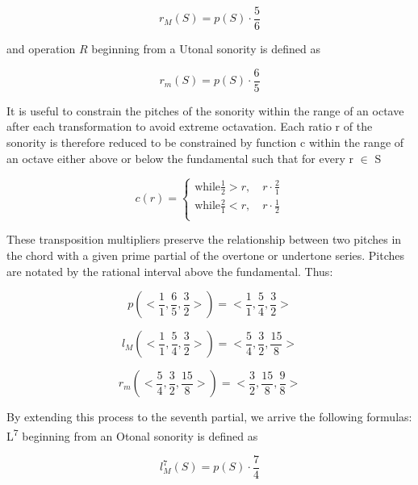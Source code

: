 \begin{equation}
    r_{M}(S)=p(S)\cdot\frac{5}{6}
\end{equation}

and operation $R$ beginning from a Utonal sonority is defined as

\begin{equation}
    r_{m}(S)=p(S)\cdot\frac{6}{5}
\end{equation}

It is useful to constrain the pitches of the sonority within the range of an octave after each transformation to avoid extreme octavation. Each ratio r of the sonority is therefore reduced to be constrained by function c within the range of an octave either above or below the fundamental such that for every r $\in$ S

\begin{equation}
    c(r)=\begin{cases}
    \text{while} \frac{1}{2}>r,\quad r\cdot\frac{2}{1}\\
    \text{while} \frac{2}{1}<r,\quad r\cdot\frac{1}{2}\\
    \end{cases} 
\end{equation}

These transposition multipliers preserve the relationship between two pitches in the chord with a given prime partial of the overtone or undertone series. Pitches are notated by the rational interval above the fundamental. Thus:

\begin{equation}
    p(<\frac{1}{1},\frac{6}{5},\frac{3}{2}>)=<\frac{1}{1},\frac{5}{4},\frac{3}{2}>
\end{equation}

\begin{equation}
    l_{M}(<\frac{1}{1},\frac{5}{4},\frac{3}{2}>)=<\frac{5}{4},\frac{3}{2},\frac{15}{8}>
\end{equation}

\begin{equation}
    r_{m}(<\frac{5}{4},\frac{3}{2},\frac{15}{8}>)=<\frac{3}{2},\frac{15}{8},\frac{9}{8}>
\end{equation}

By extending this process to the seventh partial, we arrive the following formulas: L\textsuperscript{7} beginning from an Otonal sonority is defined as

\begin{equation}
    l^{7}_{M}(S)=p(S)\cdot\frac{7}{4}
\end{equation}

